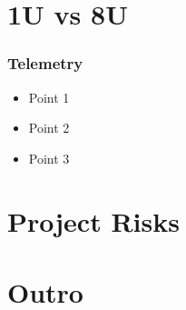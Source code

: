 \documentclass{beamer}
\begin{document}
\section{1U vs 8U}
\begin{frame}
    \frametitle{Telemetry}
    \begin{itemize}
        \item Point 1
        \item Point 2
        \item Point 3
    \end{itemize}
\end{frame}

\section{Project Risks}

\section{Outro}
\end{document}

